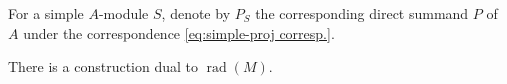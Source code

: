 \documentclass[11pt,a4paper]{article}
\makeatletter
\numberwithin{equation}{section}
\renewenvironment{proof}[1][\proofname]{\par
    \pushQED{\qed}%
    \normalfont \topsep0\p@\@plus6\p@ \labelsep1em\relax
    \trivlist
    \item[\hskip\labelsep\indent
        \bfseries #1]\ignorespaces
    \mbox{}
}{
    \popQED\endtrivlist\@endpefalse
}
\theoremstyle{all}
\newtheorem{lemma}[theorem]{Lemma}
\newtheorem{example}[theorem]{Example}
\newtheorem{definition}[theorem]{Definition}
\theoremstyle{remark}
\newcommand{\rad}{\operatorname{rad}\nolimits}
\DeclareMathOperator{\proj}{\mathsf{proj}}
\newcommand{\defn}[1]{\textsl{\color{darkblue} #1}}
\makeatother
\begin{document}
For a simple $A$-module $S$, denote by $P_S$ the corresponding direct summand $P$ of $A$ under the correspondence \eqref{eq:simple-proj corresp.}.
%
%
%
%
%
%

There is a construction dual to $\rad(M)$.
\end{document}
